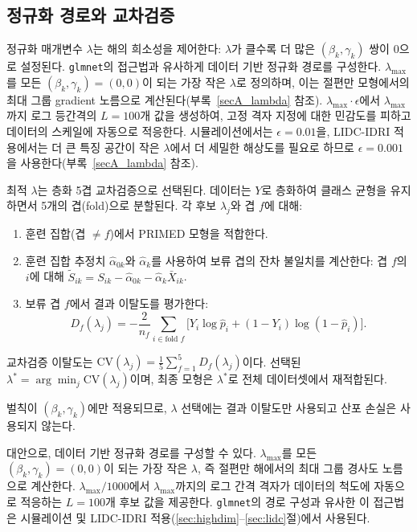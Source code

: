\documentclass[a4paper,11pt]{article}
\begin{document}
\subsection{정규화 경로와 교차검증}\label{sec:lambda_cv}

정규화 매개변수 $\lambda$는 해의 희소성을 제어한다: $\lambda$가 클수록 더 많은 $(\beta_k, \gamma_k)$ 쌍이 0으로 설정된다.
\texttt{glmnet}의 접근법과 유사하게 데이터 기반 정규화 경로를 구성한다.
$\lambda_{\max}$를 모든 $(\beta_k, \gamma_k) = (0, 0)$이 되는 가장 작은 $\lambda$로 정의하며, 이는 절편만 모형에서의 최대 그룹 gradient 노름으로 계산된다(부록~\ref{secA_lambda} 참조).
$\lambda_{\max} \cdot \epsilon$에서 $\lambda_{\max}$까지 로그 등간격의 $L = 100$개 값을 생성하여, 고정 격자 지정에 대한 민감도를 피하고 데이터의 스케일에 자동으로 적응한다.
시뮬레이션에서는 $\epsilon = 0.01$을, LIDC-IDRI 적용에서는 더 큰 특징 공간이 작은 $\lambda$에서 더 세밀한 해상도를 필요로 하므로 $\epsilon = 0.001$을 사용한다(부록~\ref{secA_lambda} 참조).

최적 $\lambda$는 층화 5겹 교차검증으로 선택된다.
데이터는 $Y$로 층화하여 클래스 균형을 유지하면서 5개의 겹(fold)으로 분할된다.
각 후보 $\lambda_j$와 겹 $f$에 대해:
\begin{enumerate}
  \item 훈련 집합(겹 $\neq f$)에서 PRIMED 모형을 적합한다.
  \item 훈련 집합 추정치 $\hat\alpha_{0k}$와 $\hat\alpha_k$를 사용하여 보류 겹의 잔차 불일치를 계산한다: 겹 $f$의 $i$에 대해 $\tilde S_{ik} = S_{ik} - \hat\alpha_{0k} - \hat\alpha_k \bar X_{ik}$.
  \item 보류 겹 $f$에서 결과 이탈도를 평가한다:
    \[
      D_f(\lambda_j) = -\frac{2}{n_f}\sum_{i \in \text{fold } f}
        \bigl[Y_i \log \hat p_i + (1-Y_i)\log(1-\hat p_i)\bigr].
    \]
\end{enumerate}
교차검증 이탈도는 $\mathrm{CV}(\lambda_j) = \frac{1}{5}\sum_{f=1}^5 D_f(\lambda_j)$이다.
선택된 $\lambda^* = \arg\min_j \mathrm{CV}(\lambda_j)$이며, 최종 모형은 $\lambda^*$로 전체 데이터셋에서 재적합된다.

벌칙이 $(\beta_k, \gamma_k)$에만 적용되므로, $\lambda$ 선택에는 결과 이탈도만 사용되고 산포 손실은 사용되지 않는다.

대안으로, 데이터 기반 정규화 경로를 구성할 수 있다.
$\lambda_{\max}$를 모든 $(\beta_k, \gamma_k) = (0, 0)$이 되는 가장 작은 $\lambda$, 즉 절편만 해에서의 최대 그룹 경사도 노름으로 계산한다.
$\lambda_{\max}/1000$에서 $\lambda_{\max}$까지의 로그 간격 격자가 데이터의 척도에 자동으로 적응하는 $L = 100$개 후보 값을 제공한다.
\texttt{glmnet}의 경로 구성과 유사한 이 접근법은 시뮬레이션 및 LIDC-IDRI 적용(\ref{sec:highdim}--\ref{sec:lidc}절)에서 사용된다.
\end{document}
